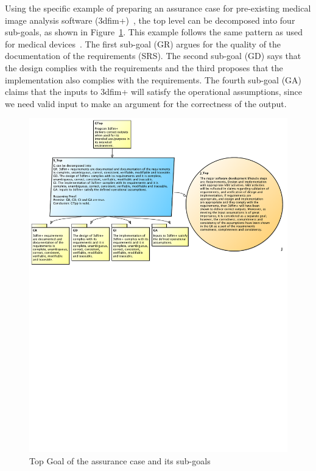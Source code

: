 \documentclass[final, 3p, times, authoryear]{elsarticle}
\begin{document}
Using the specific example of preparing an assurance case for pre-existing
medical image analysis software (3dfim+)~\cite{SmithEtAl2018_ICSEPoster}, the
top level can be decomposed into four sub-goals, as shown in
Figure~\ref{TopGoal}.  This example follows the same pattern as used for medical
devices~\cite{Wassyng2015}.  The first sub-goal (GR) argues for the quality of
the documentation of the requirements (SRS).  The second sub-goal (GD) says that
the design complies with the requirements and the third proposes that the
implementation also complies with the requirements.  The fourth sub-goal (GA)
claims that the inputs to 3dfim+ will satisfy the operational assumptions, since
we need valid input to make an argument for the correctness of the output.

\begin{figure}[!h]
\centering
\includegraphics[width=1.0\textwidth]{./figures/TopGoal.pdf}
\caption{Top Goal of the assurance case and its sub-goals}
\label{TopGoal}
\end{figure}
\end{document}
